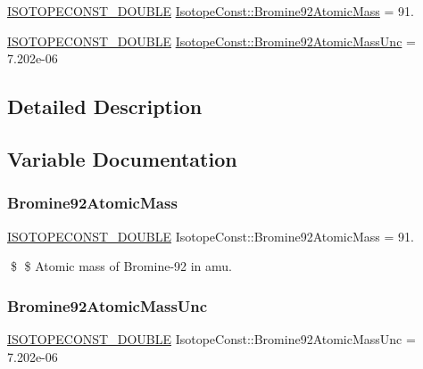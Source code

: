 \begin{DoxyCompactItemize}
\item 
\mbox{\hyperlink{group___isotope_const-_macros_ga8f45a7272ce02c0b4c65c44636ed719a}{I\+S\+O\+T\+O\+P\+E\+C\+O\+N\+S\+T\+\_\+\+D\+O\+U\+B\+LE}} \mbox{\hyperlink{group___isotope_const-_bromine-_br92_gae325f702875c722cf7cf6b0d106fccbc}{Isotope\+Const\+::\+Bromine92\+Atomic\+Mass}} = 91.
\item 
\mbox{\hyperlink{group___isotope_const-_macros_ga8f45a7272ce02c0b4c65c44636ed719a}{I\+S\+O\+T\+O\+P\+E\+C\+O\+N\+S\+T\+\_\+\+D\+O\+U\+B\+LE}} \mbox{\hyperlink{group___isotope_const-_bromine-_br92_ga7ca397637d52ca0ec616a39ee2d3f351}{Isotope\+Const\+::\+Bromine92\+Atomic\+Mass\+Unc}} = 7.\+202e-\/06
\end{DoxyCompactItemize}


\subsection{Detailed Description}


\subsection{Variable Documentation}
\mbox{\label{group___isotope_const-_bromine-_br92_gae325f702875c722cf7cf6b0d106fccbc}} 
\subsubsection{\texorpdfstring{Bromine92\+Atomic\+Mass}{Bromine92AtomicMass}}
{\footnotesize\ttfamily \mbox{\hyperlink{group___isotope_const-_macros_ga8f45a7272ce02c0b4c65c44636ed719a}{I\+S\+O\+T\+O\+P\+E\+C\+O\+N\+S\+T\+\_\+\+D\+O\+U\+B\+LE}} Isotope\+Const\+::\+Bromine92\+Atomic\+Mass = 91.}

\$ \$ Atomic mass of Bromine-\/92 in amu. \mbox{\label{group___isotope_const-_bromine-_br92_ga7ca397637d52ca0ec616a39ee2d3f351}} 
\subsubsection{\texorpdfstring{Bromine92\+Atomic\+Mass\+Unc}{Bromine92AtomicMassUnc}}
{\footnotesize\ttfamily \mbox{\hyperlink{group___isotope_const-_macros_ga8f45a7272ce02c0b4c65c44636ed719a}{I\+S\+O\+T\+O\+P\+E\+C\+O\+N\+S\+T\+\_\+\+D\+O\+U\+B\+LE}} Isotope\+Const\+::\+Bromine92\+Atomic\+Mass\+Unc = 7.\+202e-\/06}


